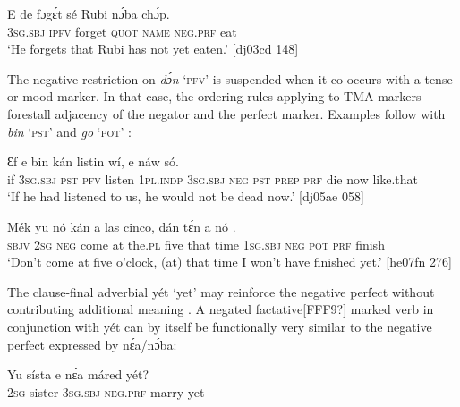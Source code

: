 \ea%
    \label{ex:key:395}
    \gll E    de  fɔgɛ́t  sé    Rubi    nɔ́ba  chɔ́p.\\
\textsc{3sg.sbj}  \textsc{ipfv}  forget  \textsc{quot}    \textsc{name}  \textsc{neg}.\textsc{prf}  eat\\

\glt ‘He forgets that Rubi has not yet eaten.’ [dj03cd 148]
\z

The negative restriction on \textit{dɔ́n} ‘\textsc{pfv}’ is suspended when it co-occurs with a tense or mood marker. In that case, the ordering rules applying to TMA markers forestall adjacency of the negator and the perfect marker. Examples follow with \textit{bin} ‘\textsc{pst}’  and \textit{go} ‘\textsc{pot}’ :


\ea%
    \label{ex:key:396}
    \gll Ɛf  e    bin  kán  listin  wí,    e      
    náw    só.\\
if  \textsc{3sg.sbj}  \textsc{pst}  \textsc{pfv}  listen  \textsc{1pl.indp}  \textsc{3sg.sbj}  \textsc{neg}  \textsc{pst}
\textsc{prep}  \textsc{prf}  die  now    like.that\\

\glt ‘If he had listened to us, he would not be dead now.’ [dj05ae 058]
\z


\ea%
    \label{ex:key:397}
    \gll Mék    yu  nó  kán    a  las     cinco,  dán  tɛ́n  a    nó
    .\\
\textsc{sbjv}    \textsc{2sg}  \textsc{neg}  come  at  the.\textsc{pl}  five    that  time  \textsc{1sg.sbj}  \textsc{neg}
\textsc{pot}  \textsc{prf}  finish\\

\glt ‘Don’t come at five o’clock, (at) that time I won’t have finished yet.’ [he07fn 276]
\z

The clause-final adverbial yét ‘yet’ may reinforce the negative perfect without contributing additional meaning . A negated factative[FFF9?] marked verb in conjunction with yét  can by itself be functionally very similar to the negative perfect expressed by nɛ́a/nɔ́ba:


\ea%
    \label{ex:key:398}
    \gll Yu  sísta    e    nɛ́a    máred  yét?\\
\textsc{2sg}  sister  \textsc{3sg.sbj}  \textsc{neg}.\textsc{prf}  marry  yet\\

